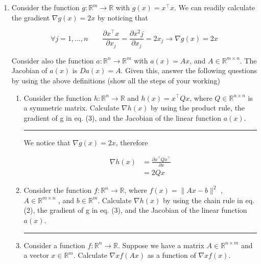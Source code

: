\documentclass[12pt]{article}
\begin{document}
\begin{enumerate}

    \item Consider the function $g : \mathbb{R}^m \rightarrow \mathbb{R}$ with $g(x)= x^\intercal x$. We can readily calculate the gradient $\nabla g(x)=2x$ by noticing that 
    
    \begin{equation}
        \forall j = 1, \dots, n \qquad \frac{\partial x^\intercal x}{\partial x_j} = \frac{\partial x^2 j}{\partial x_j} = 2x_j \rightarrow \nabla g(x) = 2x
    \end{equation}

    Consider also the function $a : \mathbb{R}^n \rightarrow \mathbb{R}^m$ with $a(x)= Ax$, and $A \in \mathbb{R}^{m \times n}$. The Jacobian of $a(x)$ is $Da(x)= A$. 
    Given this, answer the following questions by using the above definitions (show all the steps of your working) 

    \begin{enumerate}

        \item Consider the function $h : \mathbb{R}^n \rightarrow \mathbb{R}$ and $h(x)= x^\intercal Qx$, where $Q \in \mathbb{R}^{n \times n}$ is a symmetric matrix. Calculate $\nabla h(x)$ by using the product rule, the gradient of g in eq. (3), and the Jacobian of the linear function $a(x)$. 
        
        \noindent\rule{\linewidth}{1pt}
        
        We notice that $\nabla g(x)=2x$, therefore 

        \begin{align*}
            \nabla h(x) &= \frac{\partial x^\intercal Qx^\intercal}{\partial x} \\
                        &= 2Qx
        \end{align*}
        
        \item Consider the function $f : \mathbb{R}^n \rightarrow \mathbb{R}$, where $f(x)= \lVert Ax - b \rVert ^2$ , $A \in \mathbb{R}^{m \times n}$ , and $b \in \mathbb{R}^m $. Calculate $\nabla h(x)$ by using the chain rule in eq. (2), the gradient of g in eq. (3), and the Jacobian of the linear function $a(x)$. 
        
        \noindent\rule{\linewidth}{1pt}
        
        \item Consider a function $f : \mathbb{R}^n \rightarrow \mathbb{R}$. Suppose we have a matrix $A \in \mathbb{R}^{n \times m}$ and a vector $x \in \mathbb{R}^m $. Calculate $\nabla xf(Ax)$ as a function of $\nabla xf(x)$.
        

\end{enumerate}
\end{enumerate}
\end{document}
